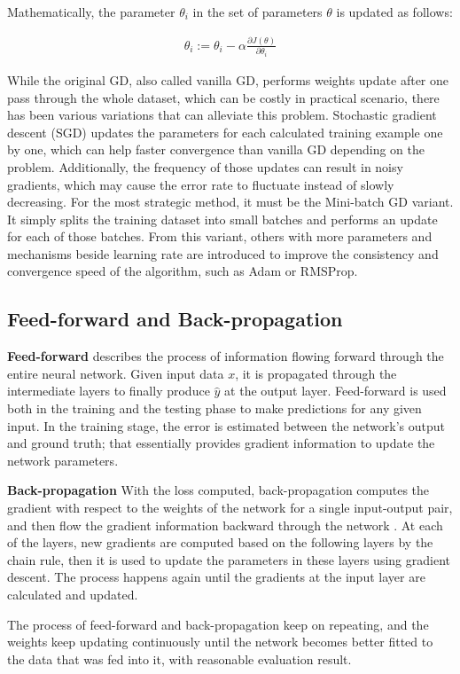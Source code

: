 Mathematically, the parameter $\theta_i$ in the set of parameters $\theta$ is updated as follows:

\begin{align}
    \theta_i := \theta_i - \alpha \frac{\partial J(\theta)}{\partial \theta_i}
\end{align}

While the original GD, also called vanilla GD, performs weights update after one pass through the whole dataset, which can be costly in practical scenario, there has been various variations that can alleviate this problem.
Stochastic gradient descent (SGD) \cite{bottou2010large} updates the parameters for each calculated training example one by one, which can help faster convergence than vanilla GD depending on the problem.  Additionally, the frequency of those updates can result in noisy gradients, which may cause the error rate to fluctuate instead of slowly decreasing. For the most strategic method, it must be the Mini-batch GD variant. It simply splits the training dataset into small batches and performs an update for each of those batches. From this variant, others with more parameters and mechanisms beside learning rate are introduced to improve the consistency and convergence speed of the algorithm, such as Adam \cite{kingma2014adam} or RMSProp.


\subsection{Feed-forward and Back-propagation}

\textbf{Feed-forward} describes the process of information flowing forward through the entire neural network. Given input data $x$, it is propagated through the intermediate layers to finally produce $\hat{y}$ at the output layer. Feed-forward is used both in the training and the testing phase to make predictions for any given input. In the training stage, the error is estimated between the network's output and ground truth; that essentially provides gradient information to update the network parameters. 

\textbf{Back-propagation} 
With the loss computed, back-propagation computes the gradient with respect to the weights of the network for a single input-output pair, and then flow the gradient information backward through the network . At each of the layers, new gradients are computed based on the following layers by the chain rule, then it is used to update the parameters in these layers using gradient descent. The process happens again until the gradients at the input layer are calculated and updated.

The process of feed-forward and back-propagation keep on repeating, and the weights keep updating continuously until the network becomes better fitted to the data that was fed into it, with reasonable evaluation result.
